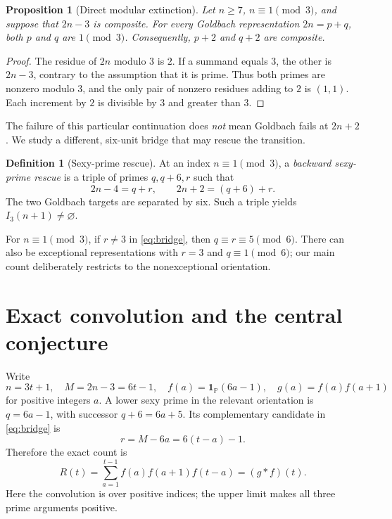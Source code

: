 \documentclass[11pt,a4paper]{article}
\newtheorem{proposition}[theorem]{Proposition}
\theoremstyle{definition}
\newtheorem{definition}[theorem]{Definition}
\newcommand{\PP}{\mathbb P}
\newcommand{\one}{\mathbf 1}
\begin{document}
\begin{proposition}[Direct modular extinction]\label{prop:direct}
Let $n\ge7$, $n\equiv1\pmod3$, and suppose that $2n-3$ is composite.
For every Goldbach representation $2n=p+q$, both $p$ and $q$ are
$1\pmod3$. Consequently, $p+2$ and $q+2$ are composite.
\end{proposition}
\begin{proof}
The residue of $2n$ modulo $3$ is $2$. If a summand equals $3$,
the other is $2n-3$, contrary to the assumption that it is prime.
Thus both primes are nonzero modulo $3$, and the only pair of
nonzero residues adding to $2$ is $(1,1)$. Each increment by $2$
is divisible by $3$ and greater than $3$.
\end{proof}

The failure of this particular continuation does \emph{not} mean Goldbach
fails at $2n+2$. We study a different, six-unit bridge that may rescue
the transition.

\begin{definition}[Sexy-prime rescue]\label{def:rescue}
At an index $n\equiv1\pmod3$, a \emph{backward sexy-prime rescue}
is a triple of primes $q,q+6,r$ such that
\begin{equation}\label{eq:bridge}
 2n-4=q+r,\qquad 2n+2=(q+6)+r.
\end{equation}
The two Goldbach targets are separated by six. Such a triple yields
$I_3(n+1)\ne\varnothing$.
\end{definition}

For $n\equiv1\pmod3$, if $r\ne3$ in \eqref{eq:bridge}, then
$q\equiv r\equiv5\pmod6$. There can also be exceptional representations
with $r=3$ and $q\equiv1\pmod6$; our main count deliberately
restricts to the nonexceptional orientation.

\section{Exact convolution and the central conjecture}

Write
\begin{equation}\label{eq:notation}
 n=3t+1,\quad M=2n-3=6t-1,\quad
 f(a)=\one_{\PP}(6a-1),\quad g(a)=f(a)f(a+1)
\end{equation}
for positive integers $a$. A lower sexy prime in the relevant orientation
is $q=6a-1$, with successor $q+6=6a+5$.
Its complementary candidate in \eqref{eq:bridge} is
\begin{equation}\label{eq:r}
 r=M-6a=6(t-a)-1.
\end{equation}
Therefore the exact count is
\begin{equation}\label{eq:convolution}
 \boxed{R(t)=\sum_{a=1}^{t-1}f(a)f(a+1)f(t-a)
       =(g*f)(t).}
\end{equation}
Here the convolution is over positive indices; the upper limit makes all
three prime arguments positive.
\end{document}
